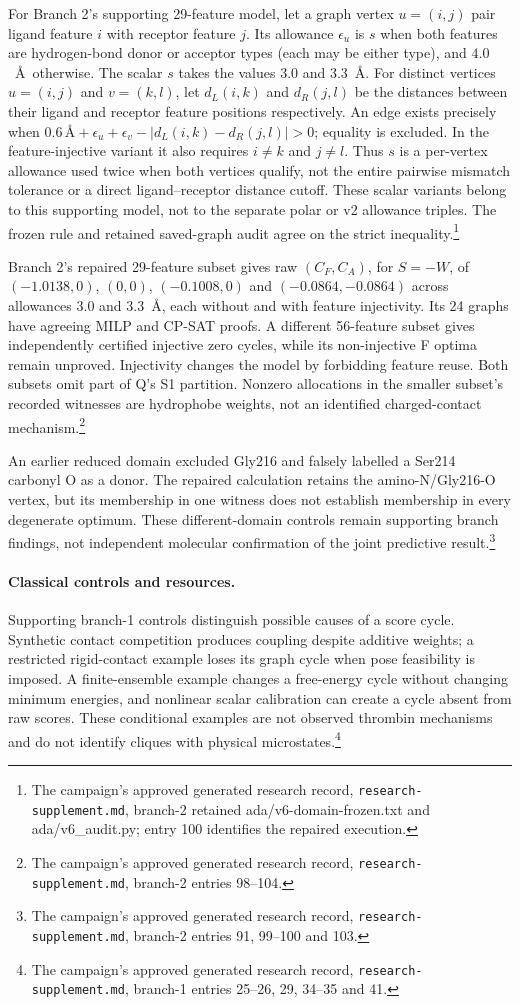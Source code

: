 \documentclass{article}
\newcommand{\rr}[1]{\footnote{The campaign's approved generated research record, \texttt{research-supplement.md}, #1.}}
\begin{document}
For Branch 2's supporting 29-feature model, let a graph vertex \(u=(i,j)\) pair ligand feature \(i\) with receptor feature \(j\). Its allowance \(\epsilon_u\) is \(s\) when both features are hydrogen-bond donor or acceptor types (each may be either type), and \(4.0\)~\AA\ otherwise. The scalar \(s\) takes the values \(3.0\) and \(3.3\)~\AA. For distinct vertices \(u=(i,j)\) and \(v=(k,l)\), let \(d_L(i,k)\) and \(d_R(j,l)\) be the distances between their ligand and receptor feature positions respectively. An edge exists precisely when \(0.6\,\text{\AA}+\epsilon_u+\epsilon_v-|d_L(i,k)-d_R(j,l)|>0\); equality is excluded. In the feature-injective variant it also requires \(i\ne k\) and \(j\ne l\). Thus \(s\) is a per-vertex allowance used twice when both vertices qualify, not the entire pairwise mismatch tolerance or a direct ligand--receptor distance cutoff. These scalar variants belong to this supporting model, not to the separate polar or v2 allowance triples. The frozen rule and retained saved-graph audit agree on the strict inequality.\rr{branch-2 retained ada/v6-domain-frozen.txt and ada/v6\_audit.py; entry 100 identifies the repaired execution}

Branch 2's repaired 29-feature subset gives raw \((C_F,C_A)\), for \(S=-W\), of \((-1.0138,0)\), \((0,0)\), \((-0.1008,0)\) and \((-0.0864,-0.0864)\) across allowances 3.0 and 3.3~\AA, each without and with feature injectivity. Its 24 graphs have agreeing MILP and CP-SAT proofs. A different 56-feature subset gives independently certified injective zero cycles, while its non-injective F optima remain unproved. Injectivity changes the model by forbidding feature reuse. Both subsets omit part of Q's S1 partition. Nonzero allocations in the smaller subset's recorded witnesses are hydrophobe weights, not an identified charged-contact mechanism.\rr{branch-2 entries 98--104}

An earlier reduced domain excluded Gly216 and falsely labelled a Ser214 carbonyl O as a donor. The repaired calculation retains the amino-N/Gly216-O vertex, but its membership in one witness does not establish membership in every degenerate optimum. These different-domain controls remain supporting branch findings, not independent molecular confirmation of the joint predictive result.\rr{branch-2 entries 91, 99--100 and 103}

\paragraph{Classical controls and resources.}
Supporting branch-1 controls distinguish possible causes of a score cycle. Synthetic contact competition produces coupling despite additive weights; a restricted rigid-contact example loses its graph cycle when pose feasibility is imposed. A finite-ensemble example changes a free-energy cycle without changing minimum energies, and nonlinear scalar calibration can create a cycle absent from raw scores. These conditional examples are not observed thrombin mechanisms and do not identify cliques with physical microstates.\rr{branch-1 entries 25--26, 29, 34--35 and 41}
\end{document}
